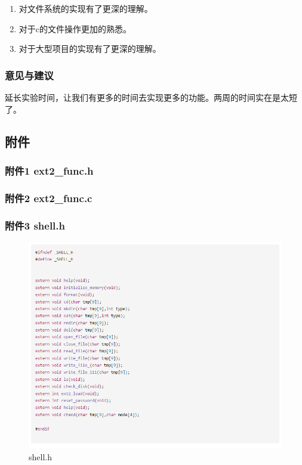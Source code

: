 \documentclass{article}
\begin{document}
    \begin{enumerate}
        \item 对文件系统的实现有了更深的理解。
        \item 对于c的文件操作更加的熟悉。
        \item 对于大型项目的实现有了更深的理解。
    \end{enumerate}
    \subsubsection{意见与建议}

    延长实验时间，让我们有更多的时间去实现更多的功能。两周的时间实在是太短了。

    \subsection{附件}

    \subsubsection{附件1 ext2\_func.h}

     
    
    \subsubsection{附件2 ext2\_func.c}

     
\newpage
    \subsubsection{附件3 shell.h}

    \begin{figure}[htbp]
        \centering
        \includegraphics[scale=0.6]{shell_h.png}
        \caption{shell.h}
        \label{30}
    \end{figure}
\end{document}
